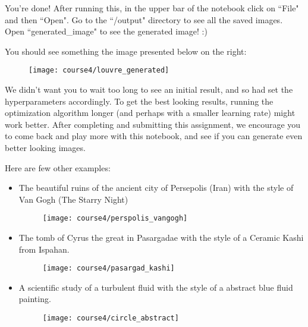 {You're done! After running this, in the upper bar of the notebook click on ``File" and then ``Open". Go to the ``/output" directory to see all the saved images. Open ``generated\_image" to see the generated image! :)

You should see something the image presented below on the right:
\begin{figure}[h]
\begin{center}
\texttt{[image: course4/louvre\_generated]}
\end{center}
\end{figure}

We didn't want you to wait too long to see an initial result, and so had set the hyperparameters accordingly. To get the best looking results, running the optimization algorithm longer (and perhaps with a smaller learning rate) might work better. After completing and submitting this assignment, we encourage you to come back and play more with this notebook, and see if you can generate even better looking images.

Here are few other examples:
\begin{itemize}
\item The beautiful ruins of the ancient city of Persepolis (Iran) with the style of Van Gogh (The Starry Night)
\begin{figure}[h]
\begin{center}
\texttt{[image: course4/perspolis\_vangogh]}
\end{center}
\end{figure}

\item The tomb of Cyrus the great in Pasargadae with the style of a Ceramic Kashi from Ispahan.
\begin{figure}[h]
\begin{center}
\texttt{[image: course4/pasargad\_kashi]}
\end{center}
\end{figure}

\item A scientific study of a turbulent fluid with the style of a abstract blue fluid painting.
\begin{figure}[h]
\begin{center}
\texttt{[image: course4/circle\_abstract]}
\end{center}
\end{figure}

\end{itemize}



}
